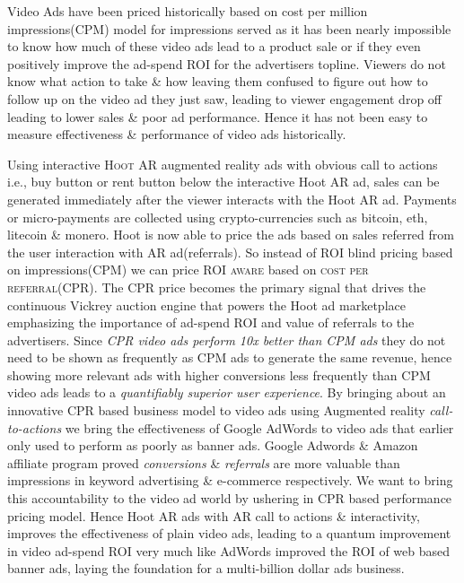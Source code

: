 Video Ads have been priced historically based on cost per million impressions(CPM) model for impressions served as it has been nearly impossible to know how much of these video ads lead to a product sale or if they even positively improve the ad-spend ROI for the advertisers topline. Viewers do not know what action to take \& how leaving them confused to figure out how to follow up on the video ad they just saw, leading to viewer engagement drop off leading to lower sales \& poor ad performance. Hence it has not been easy to measure effectiveness \& performance of video ads historically.

Using interactive \textsc{Hoot AR} augmented reality ads with obvious call to actions i.e., buy button or rent button below the interactive Hoot AR ad, sales can be generated immediately after the viewer interacts with the Hoot AR ad. Payments or micro-payments are collected using crypto-currencies such as bitcoin, eth, litecoin \& monero. Hoot is now able to price the ads based on sales referred from the user interaction with AR ad(referrals). So instead of ROI blind pricing based on impressions(CPM) we can price \textsc{ROI aware} based on \textsc{cost per referral(CPR)}. The CPR price becomes the primary signal that drives the continuous Vickrey auction engine that powers the Hoot ad marketplace emphasizing the importance of ad-spend ROI and value of referrals to the advertisers. Since \emph{CPR video ads perform 10x better than CPM ads} they do not need to be shown as frequently as CPM ads to generate the same revenue, hence showing more relevant ads with higher conversions less frequently than CPM video ads leads to a \emph{quantifiably superior user experience}. By bringing about an innovative CPR based business model to video ads using Augmented reality \emph{call-to-actions} we bring the effectiveness of Google AdWords to video ads that earlier only used to perform as poorly as banner ads. Google Adwords \& Amazon affiliate program proved \emph{conversions} \& \emph{referrals} are more valuable than impressions in keyword advertising \& e-commerce respectively. We want to bring this accountability to the video ad world by ushering in CPR based performance pricing model. Hence Hoot AR ads with AR call to actions \& interactivity, improves the effectiveness of plain video ads, leading to a quantum improvement in video ad-spend ROI very much like AdWords improved the ROI of web based banner ads, laying the foundation for a multi-billion dollar ads business. 
